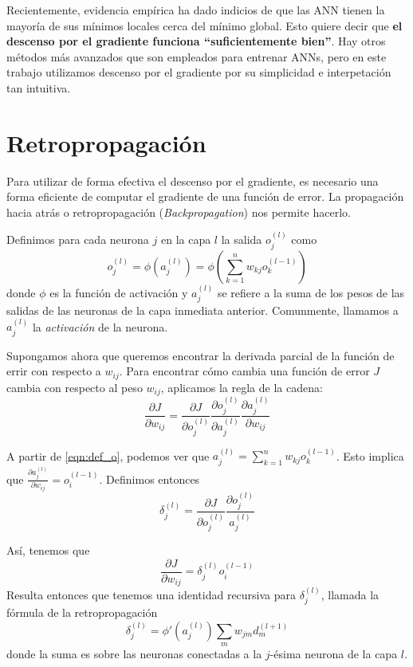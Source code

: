 Recientemente, evidencia empírica \cite{choromanska} ha dado indicios
de que las ANN tienen la mayoría de sus mínimos locales cerca del
mínimo global.  Esto quiere decir que \textbf{el descenso por el
gradiente funciona ``suficientemente bien''}. Hay otros métodos más
avanzados que son empleados para entrenar ANNs, pero en este trabajo
utilizamos descenso por el gradiente por su simplicidad e
interpetación tan intuitiva.

\section{Retropropagación}
Para utilizar de forma efectiva el descenso por el gradiente, es
necesario una forma eficiente de computar el gradiente de una función
de error. La propagación hacia atrás o retropropagación
(\textit{Backpropagation}) nos permite hacerlo.

Definimos para cada neurona $j$ en la capa $l$ la salida $o^{(l)}_j$ como
\begin{equation}
\label{eqn:def_o}
  o^{(l)}_j = \phi(a^{(l)}_j) = \phi(\sum_{k=1}^n w_{kj}o_k^{(l-1)})
\end{equation}
donde $\phi$ es la función de activación y $a_j^{(l)}$ se refiere a la
suma de los pesos de las salidas de las neuronas de la capa inmediata
anterior. Comunmente, llamamos a $a_j^{(l)}$ la \textit{activación} de
la neurona.

Supongamos ahora que queremos encontrar la derivada parcial de la
función de errir con respecto a $w_{ij}$.
Para encontrar cómo cambia una función de error $J$ cambia con respecto
al peso $w_{ij}$, aplicamos la regla de la cadena:
\begin{equation}
  \frac{\partial J}{\partial w_{ij}} = \frac{\partial J}{\partial o_j^{(l)}}
  \frac{\partial o_j^{(l)}}{\partial a_j^{(l)}} \frac{\partial a_j^{(l)}}{\partial w_{ij}}
\end{equation}

A partir de \ref{eqn:def_o}, podemos ver que
$a_j^{(l)} = \sum_{k=1}^n w_{kj}o_k^{(l-1)}$. Esto implica que
$\frac{\partial a_j^{(l)}}{\partial w_{ij}} = o_i^{(l-1)}$. Definimos entonces
\begin{equation}
  \delta_j^{(l)} = \frac{\partial J}{\partial o_j^{(l)}} \frac{\partial o_j^{(l)}}{a_j^{(l)}}
\end{equation}

Así, tenemos que
\begin{equation}
  \frac{\partial J}{\partial w_{ij}} = \delta_j^{(l)}o_i^{(l-1)}
\end{equation}
Resulta entonces que tenemos una identidad recursiva para
$\delta_j^{(l)}$, llamada la fórmula de la retropropagación
\begin{equation}
  \delta_j^{(l)} = \phi'(a_j^{(l)})\sum_m w_{jm} d_m^{(l+1)}
\end{equation}
donde la suma es sobre las neuronas conectadas a la $j$-ésima neurona
de la capa $l$.

